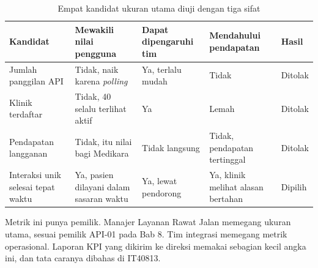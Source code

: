 \begin{table}[!htb]
  \centering
  \caption{Empat kandidat ukuran utama diuji dengan tiga sifat}
  \label{tab:ch12-kandidat}
  \footnotesize
  \begin{tabularx}{\textwidth}{H{3.4cm}GH{2.1cm}GH{1.3cm}}
    \hline
    \textbf{Kandidat} & \textbf{Mewakili nilai pengguna} & \textbf{Dapat dipengaruhi tim} & \textbf{Mendahului pendapatan} & \textbf{Hasil} \\ \hline
    Jumlah panggilan API & Tidak, naik karena \textit{polling} & Ya, terlalu mudah & Tidak & Ditolak \\ \hline
    Klinik terdaftar & Tidak, 40 selalu terlihat aktif & Ya & Lemah & Ditolak \\ \hline
    Pendapatan langganan & Tidak, itu nilai bagi Medikara & Tidak langsung & Tidak, pendapatan tertinggal & Ditolak \\ \hline
    Interaksi unik selesai tepat waktu & Ya, pasien dilayani dalam sasaran waktu & Ya, lewat pendorong & Ya, klinik melihat alasan bertahan & Dipilih \\ \hline
  \end{tabularx}
\end{table}

Metrik ini punya pemilik. Manajer Layanan Rawat Jalan memegang ukuran utama, sesuai pemilik API-01 pada Bab 8. Tim integrasi memegang metrik operasional. Laporan
KPI yang dikirim ke direksi memakai sebagian kecil angka ini, dan tata caranya dibahas di IT40813.

